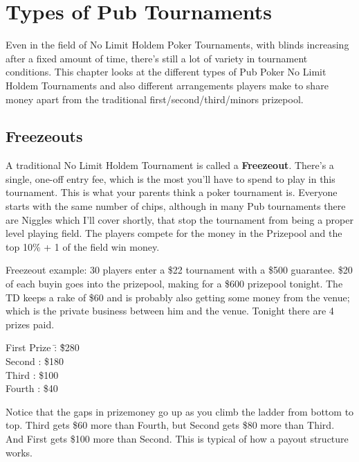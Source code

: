 \chapter{Types of Pub Tournaments}


Even in the field of No Limit Holdem Poker Tournaments,
with blinds increasing after a fixed amount of time, there's still a
lot of variety in tournament conditions. This chapter
looks at the different types of Pub Poker No Limit Holdem Tournaments
and also different arrangements players make to share money apart
from the traditional first/second/third/minors prizepool.

\section{Freezeouts}

A traditional No Limit Holdem Tournament is called a \textbf{Freezeout}.
There's a single, one-off entry fee, which is the most you'll have to
spend to play in this tournament. This is what your parents
think a poker tournament is. Everyone starts with the same number
of chips, although in many Pub tournaments there are Niggles which
I'll cover shortly, that stop the tournament from being a proper
level playing field. The players compete for the
money in the Prizepool and the top 10\% + 1 of the field win money.

Freezeout example: 30 players enter a \$22 tournament with a \$500
guarantee. \$20 of each buyin goes into the prizepool, making for a \$600
prizepool tonight. The TD keeps a rake of \$60 and is probably also
getting some money from the venue; which is the private business
between him and the venue. Tonight there are 4 prizes paid.

\begin{tabbing}
First Prize  \=: \= \$280 \\
Second       \>: \> \$180 \\
Third        \>: \> \$100 \\
Fourth       \>: \> \$40
\end{tabbing}


Notice that the gaps in prizemoney go up as you climb the ladder
from bottom to top. Third gets \$60 more than Fourth, but Second gets
\$80 more than Third. And First gets \$100 more than Second. This is
typical of how a payout structure works.

